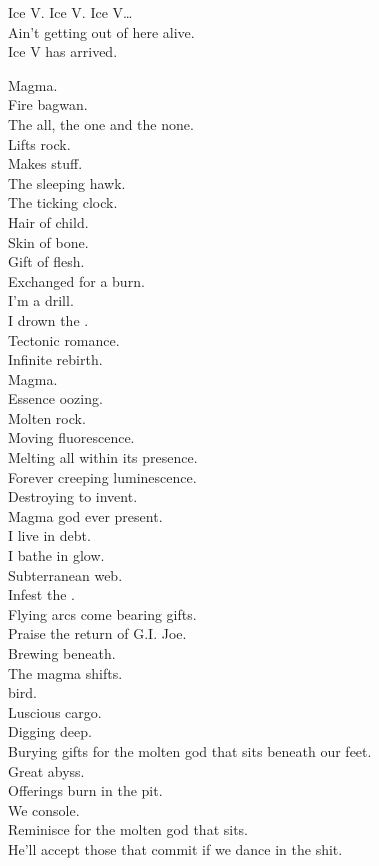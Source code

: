 Ice V. Ice V. Ice V… \\

Ain't getting out of here alive. \\
Ice V has arrived. \\




Magma. \\
Fire bagwan. \\
The all, the one and the none. \\
Lifts rock. \\
Makes stuff. \\
The sleeping hawk. \\
The ticking clock. \\
Hair of child. \\
Skin of bone. \\
Gift of flesh. \\
Exchanged for a burn. \\
I'm a drill. \\
I drown the . \\
Tectonic romance. \\
Infinite rebirth. \\

Magma. \\
Essence oozing. \\
Molten rock. \\
Moving fluorescence. \\
Melting all within its presence. \\
Forever creeping luminescence. \\
Destroying to invent. \\
Magma god ever present. \\
I live in debt. \\
I bathe in glow. \\
Subterranean web. \\
Infest the . \\
Flying arcs come bearing gifts. \\
Praise the return of G.I. Joe. \\
Brewing beneath. \\
The magma shifts. \\
 bird. \\
Luscious cargo. \\
Digging deep. \\
Burying gifts for the molten god that sits beneath our feet. \\
Great abyss. \\
Offerings burn in the pit. \\
We console. \\
Reminisce for the molten god that sits. \\
He'll accept those that commit if we dance in the shit. \\

